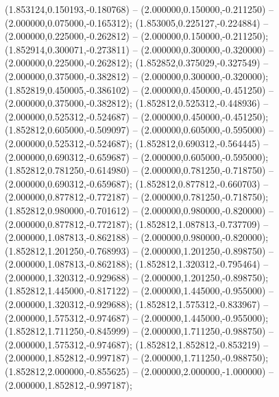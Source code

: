  (1.853124,0.150193,-0.180768) -- (2.000000,0.150000,-0.211250) -- (2.000000,0.075000,-0.165312);
 (1.853005,0.225127,-0.224884) -- (2.000000,0.225000,-0.262812) -- (2.000000,0.150000,-0.211250);
 (1.852914,0.300071,-0.273811) -- (2.000000,0.300000,-0.320000) -- (2.000000,0.225000,-0.262812);
 (1.852852,0.375029,-0.327549) -- (2.000000,0.375000,-0.382812) -- (2.000000,0.300000,-0.320000);
 (1.852819,0.450005,-0.386102) -- (2.000000,0.450000,-0.451250) -- (2.000000,0.375000,-0.382812);
 (1.852812,0.525312,-0.448936) -- (2.000000,0.525312,-0.524687) -- (2.000000,0.450000,-0.451250);
 (1.852812,0.605000,-0.509097) -- (2.000000,0.605000,-0.595000) -- (2.000000,0.525312,-0.524687);
 (1.852812,0.690312,-0.564445) -- (2.000000,0.690312,-0.659687) -- (2.000000,0.605000,-0.595000);
 (1.852812,0.781250,-0.614980) -- (2.000000,0.781250,-0.718750) -- (2.000000,0.690312,-0.659687);
 (1.852812,0.877812,-0.660703) -- (2.000000,0.877812,-0.772187) -- (2.000000,0.781250,-0.718750);
 (1.852812,0.980000,-0.701612) -- (2.000000,0.980000,-0.820000) -- (2.000000,0.877812,-0.772187);
 (1.852812,1.087813,-0.737709) -- (2.000000,1.087813,-0.862188) -- (2.000000,0.980000,-0.820000);
 (1.852812,1.201250,-0.768993) -- (2.000000,1.201250,-0.898750) -- (2.000000,1.087813,-0.862188);
 (1.852812,1.320312,-0.795464) -- (2.000000,1.320312,-0.929688) -- (2.000000,1.201250,-0.898750);
 (1.852812,1.445000,-0.817122) -- (2.000000,1.445000,-0.955000) -- (2.000000,1.320312,-0.929688);
 (1.852812,1.575312,-0.833967) -- (2.000000,1.575312,-0.974687) -- (2.000000,1.445000,-0.955000);
 (1.852812,1.711250,-0.845999) -- (2.000000,1.711250,-0.988750) -- (2.000000,1.575312,-0.974687);
 (1.852812,1.852812,-0.853219) -- (2.000000,1.852812,-0.997187) -- (2.000000,1.711250,-0.988750);
 (1.852812,2.000000,-0.855625) -- (2.000000,2.000000,-1.000000) -- (2.000000,1.852812,-0.997187);
